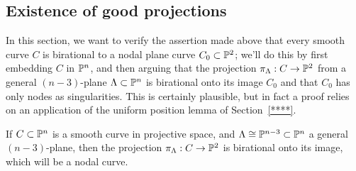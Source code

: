 \subsection{Existence of good projections}\label{projection section}

In this section, we want to verify the assertion made above that every smooth curve $C$ is birational to a nodal plane curve $C_0 \subset {\mathbb P}^2$; we'll do this by first embedding $C$ in ${\mathbb P}^n$, and then arguing that the projection $\pi_\Lambda : C \to {\mathbb P}^2$ from a general $(n-3)$-plane $\Lambda \subset {\mathbb P}^n$ is birational onto its image $C_0$ and that $C_0$ has only nodes as singularities. This is certainly plausible, but in fact a proof relies on an application of the uniform position lemma of Section~\ref{****}.

\begin{proposition}\label{nodal projection}
If $C \subset {\mathbb P}^n$ is a smooth curve in projective space, and $\Lambda \cong {\mathbb P}^{n-3} \subset {\mathbb P}^n$ a general $(n-3)$-plane, then the projection $\pi_\Lambda : C \to {\mathbb P}^2$ is birational onto its image, which will be a nodal curve.
\end{proposition}

